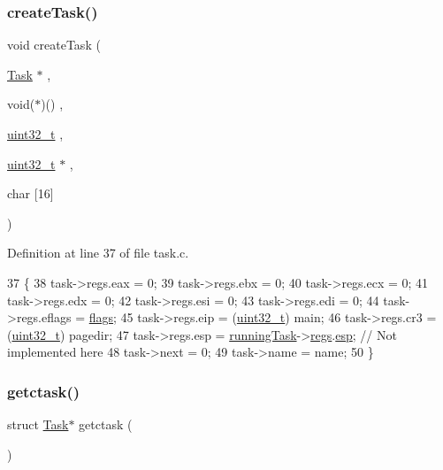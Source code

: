 \subsubsection{\texorpdfstring{create\+Task()}{createTask()}}
{\footnotesize\ttfamily void create\+Task (\begin{DoxyParamCaption}\item[{\hyperlink{a00142}{Task} $\ast$}]{,  }\item[{void($\ast$)()}]{,  }\item[{\hyperlink{a00101_a435d1572bf3f880d55459d9805097f62_a435d1572bf3f880d55459d9805097f62}{uint32\+\_\+t}}]{,  }\item[{\hyperlink{a00101_a435d1572bf3f880d55459d9805097f62_a435d1572bf3f880d55459d9805097f62}{uint32\+\_\+t} $\ast$}]{,  }\item[{char}]{\mbox{[}16\mbox{]} }\end{DoxyParamCaption})}



Definition at line 37 of file task.\+c.


\begin{DoxyCode}
37                                                                                               \{
38     task->regs.eax = 0;
39     task->regs.ebx = 0;
40     task->regs.ecx = 0;
41     task->regs.edx = 0;
42     task->regs.esi = 0;
43     task->regs.edi = 0;
44     task->regs.eflags = \hyperlink{a00074_aa2585d779da0ab21273a8d92de9a0ebe_aa2585d779da0ab21273a8d92de9a0ebe}{flags};
45     task->regs.eip = (\hyperlink{a00101_a435d1572bf3f880d55459d9805097f62_a435d1572bf3f880d55459d9805097f62}{uint32\_t}) main;
46     task->regs.cr3 = (\hyperlink{a00101_a435d1572bf3f880d55459d9805097f62_a435d1572bf3f880d55459d9805097f62}{uint32\_t}) pagedir;
47     task->regs.esp = \hyperlink{a00053_a2c195d425b4a6791b3a89f7b219f93d9_a2c195d425b4a6791b3a89f7b219f93d9}{runningTask}->\hyperlink{a00142_a136b243ee52ff89e9ba97f4e4dba19bb_a136b243ee52ff89e9ba97f4e4dba19bb}{regs}.\hyperlink{a00138_aca352215ac1e37f833da4f6289392261_aca352215ac1e37f833da4f6289392261}{esp}; \textcolor{comment}{// Not implemented here}
48     task->next = 0;
49     task->name = name;
50 \}
\end{DoxyCode}
\mbox{\label{a00056_a5913e9b2190b2b4118ee020721a320e2_a5913e9b2190b2b4118ee020721a320e2}} 
\subsubsection{\texorpdfstring{getctask()}{getctask()}}
{\footnotesize\ttfamily struct \hyperlink{a00142}{Task}$\ast$ getctask (\begin{DoxyParamCaption}{ }\end{DoxyParamCaption})}



